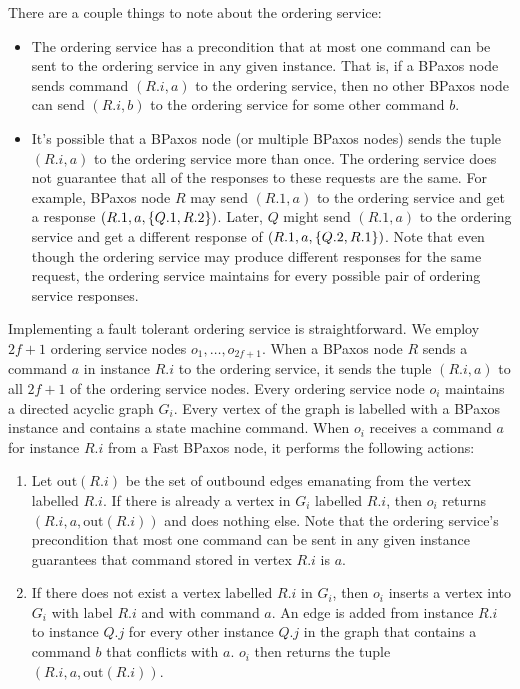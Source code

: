 There are a couple things to note about the ordering service:
\begin{itemize}
  \item
    The ordering service has a precondition that at most one command can be
    sent to the ordering service in any given instance. That is, if a BPaxos
    node sends command $(R.i, a)$ to the ordering service, then no other BPaxos
    node can send $(R.i, b)$ to the ordering service for some other command
    $b$.

  \item
    It's possible that a BPaxos node (or multiple BPaxos nodes) sends the tuple
    $(R.i, a)$ to the ordering service more than once. The ordering service
    does not guarantee that all of the responses to these requests are the
    same.  For example, BPaxos node $R$ may send $(R.1, a)$ to the ordering
    service and get a response $(R.1, a, \{Q.1, R.2\})$. Later, $Q$ might
    send $(R.1, a)$ to the ordering service and get a different response of
    $(R.1, a, \{Q.2, R.1\})$. Note that even though the ordering service may
    produce different responses for the same request, the ordering service
    maintains  for every possible pair of ordering
    service responses.
\end{itemize}

\newcommand{\out}{\text{out}}
Implementing a fault tolerant ordering service is straightforward. We employ
$2f + 1$ ordering service nodes $o_{1}, \ldots, o_{2f + 1}$. When a BPaxos node
$R$ sends a command $a$ in instance $R.i$ to the ordering service, it sends the
tuple $(R.i, a)$ to all $2f + 1$ of the ordering service nodes. Every ordering
service node $o_i$ maintains a directed acyclic graph $G_i$. Every vertex of
the graph is labelled with a BPaxos instance and contains a state machine
command. When $o_i$ receives a command $a$ for instance $R.i$ from a Fast
BPaxos node, it performs the following actions:
\begin{enumerate}
  \item
    Let $\out(R.i)$ be the set of outbound edges emanating from the vertex
    labelled $R.i$. If there is already a vertex in $G_i$ labelled $R.i$, then
    $o_i$ returns $(R.i, a, \out(R.i))$ and does nothing else.  Note that the
    ordering service's precondition that most one command can be sent in any
    given instance guarantees that command stored in vertex $R.i$ is $a$.
  \item
    If there does not exist a vertex labelled $R.i$ in $G_i$, then $o_i$
    inserts a vertex into $G_i$ with label $R.i$ and with command $a$. An edge
    is added from instance $R.i$ to instance $Q.j$ for every other instance
    $Q.j$ in the graph that contains a command $b$ that conflicts with $a$.
    $o_i$ then returns the tuple $(R.i, a, \out(R.i))$.
\end{enumerate}


